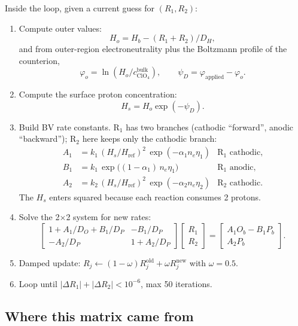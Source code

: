 \documentclass[11pt]{article}
\begin{document}
Inside the loop, given a current guess for $(R_1, R_2)$:
\begin{enumerate}
\item Compute outer values:
\[
  H_o = H_b - (R_1 + R_2)/D_H,
\]
and from outer-region electroneutrality plus the Boltzmann profile
of the counterion,
\[
  \varphi_o = \ln(H_o / c_{\mathrm{ClO_4}}^{\mathrm{bulk}}),
  \qquad
  \psi_D = \varphi_{\mathrm{applied}} - \varphi_o.
\]
\item Compute the surface proton concentration:
\[
  H_s = H_o \exp(-\psi_D).
\]
\item Build BV rate constants. R$_1$ has two branches (cathodic
``forward'', anodic ``backward''); R$_2$ here keeps only the
cathodic branch:
\begin{align*}
  A_1 &= k_1 \,(H_s/H_{\mathrm{ref}})^2\, \exp(-\alpha_1 n_e \eta_1)
        & \text{R$_1$ cathodic,}\\
  B_1 &= k_1 \,\exp\bigl((1-\alpha_1)\, n_e \eta_1\bigr)
        & \text{R$_1$ anodic,}\\
  A_2 &= k_2 \,(H_s/H_{\mathrm{ref}})^2\, \exp(-\alpha_2 n_e \eta_2)
        & \text{R$_2$ cathodic.}
\end{align*}
The $H_s$ enters squared because each reaction consumes 2 protons.
\item Solve the 2$\times$2 system for new rates:
\begin{equation}
  \begin{bmatrix}
    1 + A_1/D_O + B_1/D_P & -B_1/D_P\\
    -A_2/D_P              & 1 + A_2/D_P
  \end{bmatrix}
  \begin{bmatrix} R_1 \\ R_2 \end{bmatrix}
  =
  \begin{bmatrix} A_1 O_b - B_1 P_b \\ A_2 P_b \end{bmatrix}.
\end{equation}
\item Damped update: $R_j \leftarrow (1-\omega) R_j^{\mathrm{old}} +
\omega R_j^{\mathrm{new}}$ with $\omega = 0.5$.
\item Loop until $|\Delta R_1| + |\Delta R_2| < 10^{-6}$, max 50
iterations.
\end{enumerate}

\subsection{Where this matrix came from}
\end{document}
